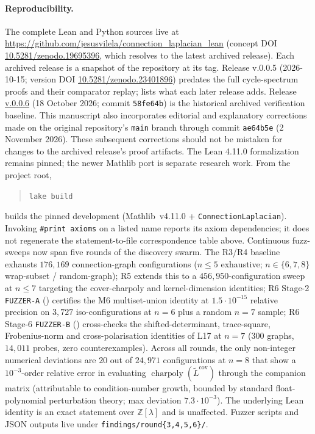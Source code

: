\documentclass[11pt,a4paper]{amsart}
\theoremstyle{plain}
\theoremstyle{definition}
\theoremstyle{remark}
\newcommand{\ZZ}{\mathbb{Z}}
\begin{document}
\paragraph{Reproducibility.} The complete Lean and Python sources
live at
\url{https://github.com/jesusvilela/connection\_laplacian\_lean}
(concept DOI
\href{https://doi.org/10.5281/zenodo.19695396}{10.5281/zenodo.19695396},
which resolves to the latest archived release). Each archived release is
a snapshot of the repository at its tag. Release v.0.0.5 (2026-10-15;
version DOI
\href{https://doi.org/10.5281/zenodo.23401896}{10.5281/zenodo.23401896})
predates the full cycle-spectrum proofs and their comparator replay;
 lists what each later release adds.
Release \href{https://github.com/jesusvilela/connection_laplacian_lean/releases/tag/v.0.0.6}{v.0.0.6}
(18 October 2026; commit \texttt{58fe64b}) is the historical archived
verification baseline. This manuscript also incorporates editorial and
explanatory corrections made on the original repository's \texttt{main}
branch through commit \texttt{ae64b5e} (2 November 2026). These
subsequent corrections should not be mistaken for changes to the
archived release's proof artifacts. The Lean 4.11.0 formalization remains
pinned; the newer Mathlib port is separate research work.
From the project root,
\begin{quote}
\verb|lake build|
\end{quote}
builds the pinned development (Mathlib~v4.11.0 +
\texttt{ConnectionLaplacian}). Invoking \verb|#print axioms| on a
listed name reports its axiom dependencies; it does not regenerate
the statement-to-file correspondence table above. Continuous
fuzz-sweeps now span five rounds of the discovery swarm. The R3/R4
baseline exhausts $176{,}169$ connection-graph configurations
($n\le 5$ exhaustive; $n\in\{6,7,8\}$ wrap-subset / random-graph);
R5 extends this to a $456{,}950$-configuration sweep at $n\le 7$
targeting the cover-charpoly and kernel-dimension identities; R6
Stage-2 \texttt{FUZZER-A} ()
certifies the M6 multiset-union identity at $1.5\cdot 10^{-15}$
relative precision on $3{,}727$ iso-configurations at $n=6$ plus a
random $n=7$ sample; R6 Stage-6 \texttt{FUZZER-B}
() cross-checks the
shifted-determinant, trace-square, Frobenius-norm and
cross-polarisation identities of L17 at $n=7$ ($300$ graphs,
$14{,}011$ probes, zero counterexamples). Across all rounds, the
only non-integer numerical deviations are $20$ out of $24{,}971$
configurations at $n=8$ that show a $10^{-3}$-order relative error
in evaluating $\operatorname{charpoly}(\widetilde L^{\mathrm{cov}})$
through the companion matrix (attributable to condition-number
growth, bounded by standard float-polynomial perturbation theory;
max deviation $7.3\cdot 10^{-3}$). The underlying Lean identity
 is an exact
statement over $\ZZ[\lambda]$ and is unaffected. Fuzzer scripts and
JSON outputs live under
\texttt{findings/round\{3,4,5,6\}/}.
\end{document}
